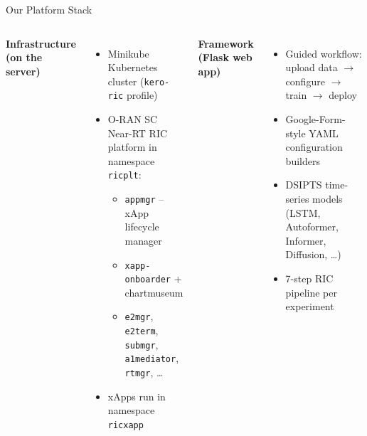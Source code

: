 \documentclass[aspectratio=169]{beamer}
\begin{document}
\begin{frame}{Our Platform Stack}
  \begin{columns}
    \textbf{Infrastructure (on the server)}
    \begin{itemize}
      \item Minikube Kubernetes cluster (\texttt{kero-ric} profile)
      \item O-RAN SC Near-RT RIC platform in namespace \texttt{ricplt}:
        \begin{itemize}
          \item \texttt{appmgr} -- xApp lifecycle manager
          \item \texttt{xapp-onboarder} + chartmuseum
          \item \texttt{e2mgr}, \texttt{e2term}, \texttt{submgr}, \texttt{a1mediator}, \texttt{rtmgr}, \ldots
        \end{itemize}
      \item xApps run in namespace \texttt{ricxapp}
    \end{itemize}
    \textbf{Framework (Flask web app)}
    \begin{itemize}
      \item Guided workflow: upload data $\rightarrow$ configure $\rightarrow$ train $\rightarrow$ deploy
      \item Google-Form-style YAML configuration builders
      \item DSIPTS time-series models (LSTM, Autoformer, Informer, Diffusion, \ldots)
      \item 7-step RIC pipeline per experiment
    \end{itemize}
  \end{columns}
\end{frame}
\end{document}
